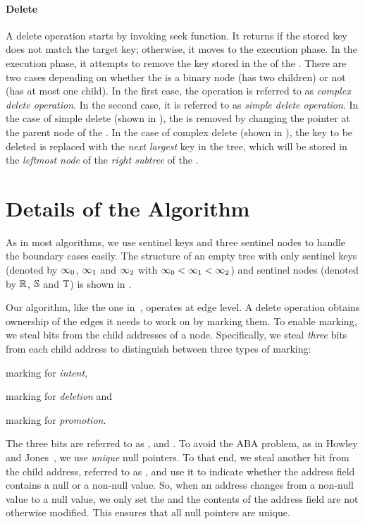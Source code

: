 \begin{limitscope}
\paragraph*{Delete} 


A delete operation starts by invoking seek function. It returns \false{} if the stored key does not match the target key; otherwise, it moves to the execution phase. In the execution phase, it attempts to remove the key stored in the \terminalnode{} of the \accesspath. There are two cases depending on whether the \terminalnode{} is a binary node (has two children) or not (has at most one child). In the first case, the operation is referred to as \emph{complex delete operation}. In the second case, it is referred to as \emph{simple delete operation}. In the case of simple delete (shown in ), the \terminalnode{} is removed by changing the pointer at the parent node of the \terminalnode. In the case of complex delete (shown in ), the key to be deleted is replaced with the \emph{next largest} key in the tree, which will be stored in the \emph{leftmost node} of the \emph{right subtree} of the \terminalnode.

\section{Details of the Algorithm}


As in most algorithms, we use sentinel keys and three sentinel nodes to handle the boundary cases easily.  The structure of an empty tree with only sentinel keys (denoted by $\infty_{0}$, $\infty_{1}$ and $\infty_{2}$ with $\infty_{0} < \infty_{1} < \infty_{2}$) and sentinel nodes (denoted by $\mathbb{R}$, $\mathbb{S}$ and $\mathbb{T}$) is shown in .


Our algorithm, like the one in~\cite{NatMit:2014:PPoPP}, operates at edge level. A delete operation obtains ownership of the edges it needs to work on by marking them. To enable marking, we steal bits from the child addresses of a node. Specifically, we steal \emph{three} bits from each child address to distinguish between three types of marking: 
\begin{enumerate*}[label=(\roman*)]
\item marking for \emph{intent}, 
\item marking for \emph{deletion} and 
\item marking for \emph{promotion}.
\end{enumerate*}
The three bits are referred to as \emph{\intentFlag}, \emph{\deleteFlag} and \emph{\promoteFlag}. To avoid the ABA problem, as in Howley and Jones~\cite{HowJon:2012:SPAA}, we use \emph{unique} null pointers. To that end, we steal another bit from the child address, referred to as \emph{\nullFlag}, and use it to indicate whether the address field contains a null or a non-null value. So, when an address changes from a non-null value to a null value, we only set the \nullFlag{} and the contents of the address field are not otherwise modified. This ensures that all null pointers are unique.


\end{limitscope}
